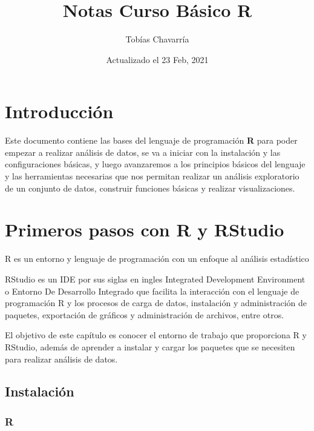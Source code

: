 \documentclass[
  12pt,
]{book}
\title{Notas Curso Básico R}
\author{Tobías Chavarría}
\date{Actualizado el 23 Feb, 2021}
\begin{document}
\maketitle

{
\hypersetup{linkcolor=}
\setcounter{tocdepth}{4}
\tableofcontents
}
\hypertarget{introducciuxf3n}{%
\chapter{Introducción}\label{introducciuxf3n}}

Este documento contiene las bases del lenguaje de programación \textbf{R} para poder
empezar a realizar análisis de datos, se va a iniciar con la instalación y las
configuraciones básicas, y luego avanzaremos a los principios básicos del
lenguaje y las herramientas necesarias que nos permitan realizar un análisis
exploratorio de un conjunto de datos, construir funciones básicas y realizar visualizaciones.

\hypertarget{primeros-pasos-con-r-y-rstudio}{%
\chapter{\texorpdfstring{\textbf{Primeros pasos con R y RStudio}}{Primeros pasos con R y RStudio}}\label{primeros-pasos-con-r-y-rstudio}}

R es un entorno y lenguaje de programación con un enfoque al análisis estadístico

RStudio es un IDE por sus siglas en ingles Integrated Development Environment o Entorno De Desarrollo Integrado que facilita la interacción con el lenguaje de programación R y los procesos de carga de datos, instalación y administración de paquetes, exportación de gráficos y administración de archivos, entre otros.

El objetivo de este capítulo es conocer el entorno de trabajo que proporciona R y RStudio, además de aprender a instalar y cargar los paquetes que se necesiten para realizar análisis de datos.

\hypertarget{instalaciuxf3n}{%
\section{\texorpdfstring{\textbf{Instalación}}{Instalación}}\label{instalaciuxf3n}}

\hypertarget{r}{%
\subsection{\texorpdfstring{\textbf{R}}{R}}\label{r}}
\end{document}
